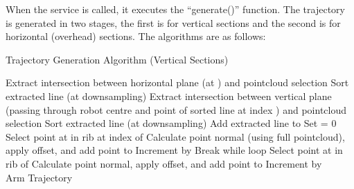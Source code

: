 When the service is called, it executes the ``generate()'' function. The trajectory is generated in two stages, the first is for vertical sections and the second is for horizontal (overhead) sections. The algorithms are as follows:
\begin{algorithm}[H]
\caption{Trajectory Generation Algorithm (Vertical Sections)}
\label{alg:trajv}
\begin{algorithmic}[1]
\begin{raggedright}
\State Extract intersection between horizontal plane (at ) and pointcloud selection
\State Sort extracted line (at  downsampling)
\State Extract intersection between vertical plane (passing through robot centre and point of sorted line at index ) and pointcloud selection
\State Sort extracted line (at  downsampling)
\State Add extracted line to 
\EndFor
\State Set  = 0
\State Select point at  in rib at index  of 
\State Calculate point normal (using full pointcloud), apply offset, and add point to 
\EndFor
\State Increment  by 
\State Break while loop
\EndIf
{}
\State Select point at  in rib  of 
\State Calculate point normal, apply offset, and add point to 
\EndFor
\State Increment  by 
\EndWhile
\EndFunction\\
\Return Arm Trajectory
\end{raggedright}
\end{algorithmic}
\end{algorithm}
